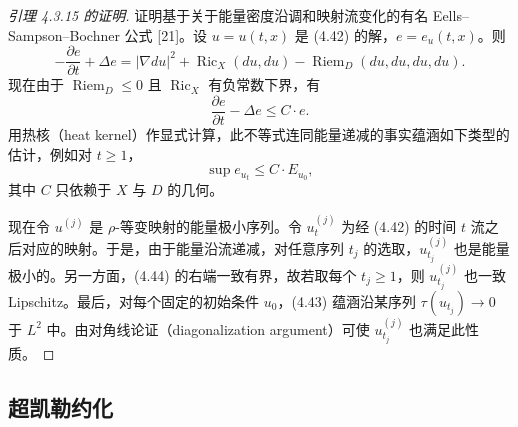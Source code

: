 \begin{proof}[引理 4.3.15 的证明]
证明基于关于能量密度沿调和映射流变化的有名 Eells--Sampson--Bochner 公式 [21]。设 $u=u(t,x)$ 是 (4.42) 的解，$e=e_u(t,x)$。则
\[
-\frac{\partial e}{\partial t}+\Delta e=|\nabla du|^2+\operatorname{Ric}_X(du,du)-\operatorname{Riem}_D(du,du,du,du).
\]
现在由于 $\operatorname{Riem}_D\le0$ 且 $\operatorname{Ric}_X$ 有负常数下界，有
\[
\frac{\partial e}{\partial t}-\Delta e\le C\cdot e.
\]
用热核（heat kernel）作显式计算，此不等式连同能量递减的事实蕴涵如下类型的估计，例如对 $t\ge1$，
\begin{equation}
\sup e_{u_t}\le C\cdot E_{u_0},
\label{eq:4.44}\tag{4.44}
\end{equation}
其中 $C$ 只依赖于 $X$ 与 $D$ 的几何。

现在令 $u^{(j)}$ 是 $\rho$-等变映射的能量极小序列。令 $u^{(j)}_t$ 为经 (4.42) 的时间 $t$ 流之后对应的映射。于是，由于能量沿流递减，对任意序列 $t_j$ 的选取，$u^{(j)}_{t_j}$ 也是能量极小的。另一方面，(4.44) 的右端一致有界，故若取每个 $t_j\ge1$，则 $u^{(j)}_{t_j}$ 也一致 Lipschitz。最后，对每个固定的初始条件 $u_0$，(4.43) 蕴涵沿某序列 $\tau(u_{t_j})\to0$ 于 $L^2$ 中。由对角线论证（diagonalization argument）可使 $u^{(j)}_{t_j}$ 也满足此性质。
\end{proof}

\subsection{超凯勒约化}

